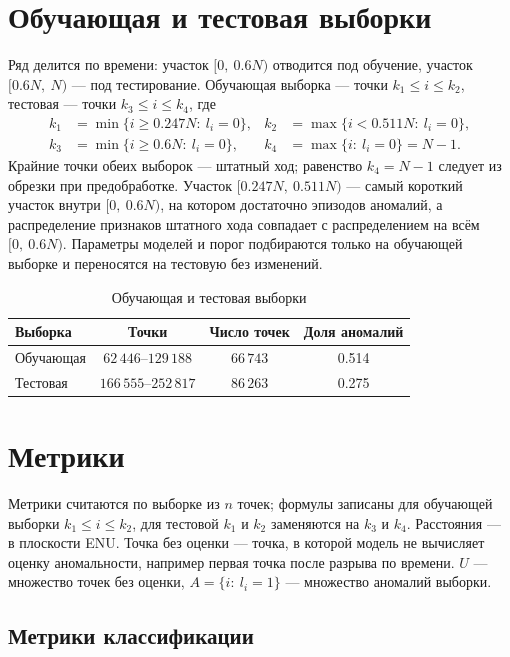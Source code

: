 \documentclass[a4paper,12pt]{report}
\begin{document}
	\section{Обучающая и тестовая выборки}

	Ряд делится по времени: участок $[0,\ 0.6N)$ отводится под обучение, участок $[0.6N,\ N)$ --- под тестирование.
	Обучающая выборка --- точки $k_1\le i\le k_2$, тестовая --- точки $k_3\le i\le k_4$, где
	\begin{align*}
		k_1&=\min\{i\ge0.247N:\ l_i=0\}, & k_2&=\max\{i<0.511N:\ l_i=0\},\\
		k_3&=\min\{i\ge0.6N:\ l_i=0\}, & k_4&=\max\{i:\ l_i=0\}=N-1.
	\end{align*}
	Крайние точки обеих выборок --- штатный ход; равенство $k_4=N-1$ следует из обрезки при предобработке.
	Участок $[0.247N,\ 0.511N)$ --- самый короткий участок внутри $[0,\ 0.6N)$, на котором достаточно эпизодов аномалий, а распределение признаков штатного хода совпадает с распределением на всём $[0,\ 0.6N)$.
	Параметры моделей и порог подбираются только на обучающей выборке и переносятся на тестовую без изменений.

	\begin{table}[H]
		\centering
		\caption{Обучающая и тестовая выборки}
		\begin{tabular}{lccc}
			\toprule
			Выборка & Точки & Число точек & Доля аномалий \\
			\midrule
			Обучающая & $62\,446$--$129\,188$ & $66\,743$ & 0.514 \\
			Тестовая & $166\,555$--$252\,817$ & $86\,263$ & 0.275 \\
			\bottomrule
		\end{tabular}
	\end{table}

	\section{Метрики}

	Метрики считаются по выборке из $n$ точек; формулы записаны для обучающей выборки $k_1\le i\le k_2$, для тестовой $k_1$ и $k_2$ заменяются на $k_3$ и $k_4$.
	Расстояния --- в плоскости ENU.
	Точка без оценки --- точка, в которой модель не вычисляет оценку аномальности, например первая точка после разрыва по времени.
	$U$ --- множество точек без оценки, $A=\{i:\ l_i=1\}$ --- множество аномалий выборки.

	\subsection{Метрики классификации}
\end{document}
